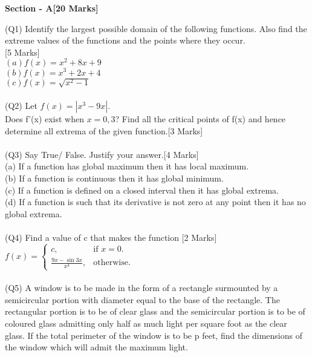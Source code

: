 \documentclass[12pt]{article}
\begin{document}
{\newpage
\begin{center}
\textbf{Section - A\hspace*{8cm}[20 Marks]}   
\end{center}
(Q1)  Identify the largest possible domain of the following functions. Also find the extreme values of the functions and the points where they occur.
\\\hspace*{12cm}[5 Marks]
\\$(a)f(x) = x^2 + 8x + 9 $\\
$(b)f(x) = x^{3} +{2x} + 4 $ \\
$(c)f(x) = \sqrt{x^2-1}$
\\\\(Q2) Let $f(x) = |x^{3}-9x|$. 
\\Does f'(x) exist when $x = 0,3$? Find all the critical points of f(x) and hence determine all extrema of the given function.\hspace*{4cm}[3 Marks]
\\\\(Q3)  Say True/ False. Justify your answer.\hspace*{4cm}[4 Marks]
\\(a) If a function has global maximum then it has local maximum.
\\(b) If a function is continuous then it has global minimum.
\\(c) If a function is defined on a closed interval then it has global extrema.
\\(d) If a function is such that its derivative is not zero at any point then it has no global extrema.
\\\\(Q4) Find a value of c that makes the function \hspace*{3cm}[2 Marks]\\
\begin{math}
  f(x)=\left\{
    \begin{array}{ll}
      c ,  & \mbox{if $x=0$}.\\
      \frac{9x - \sin 3x}{x^3}, & \mbox{otherwise}.
    \end{array}
  \right.
\end{math}
\\\\(Q5) A window is to be made in the form of a rectangle surmounted by a semicircular portion with diameter equal to the base of the rectangle. The rectangular portion is to be of clear glass and the semicircular portion is to be of coloured glass admitting only half as much light per square foot as the clear glass. If the total perimeter of the window is to be p feet, find the dimensions of the window which will admit the maximum light.
}
\end{document}
